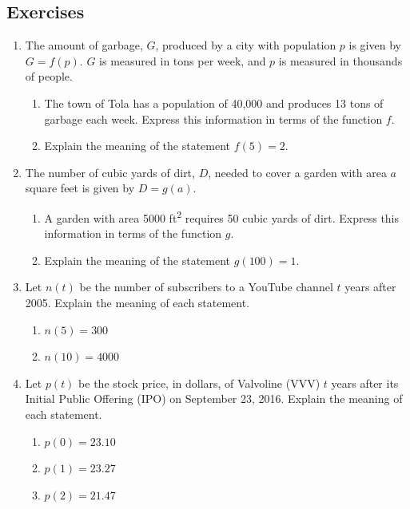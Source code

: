 \subsection{Exercises}
\label{1-2-exercises}

\begin{enumerate}
\item The amount of garbage, $G$, produced by a city with population
  $p$ is given by $G=f(p)$. $G$ is measured in tons per week, and
  $p$ is measured in thousands of people.

  \begin{enumerate}
  \item The town of Tola has a population of 40,000 and produces 13 tons of
    garbage each week. Express this information in terms of the function
    $f$.
  \item Explain the meaning of the statement $f(5)=2$.
  \end{enumerate}

\item The number of cubic yards of dirt, $D$, needed to cover a garden
  with area $a$ square feet is given by $D=g(a)$.

  \begin{enumerate}
  \item A garden with area 5000 ft\textsuperscript{2} requires 50 cubic
    yards of dirt. Express this information in terms of the function
    $g$.
  \item Explain the meaning of the statement $g(100)=1$.
  \end{enumerate}

\item Let $n(t)$ be the number of subscribers to a YouTube channel $t$ years after 2005.
  Explain the meaning of each statement.
  \begin{enumerate}
    \item $n(5) = 300$
    \item $n(10) = 4000$
\end{enumerate}

\item
  Let $p(t)$ be the stock price, in dollars, of Valvoline (VVV) $t$ years after its Initial Public Offering (IPO) on September 23, 2016. Explain the meaning of each statement.
  \begin{enumerate}
    \item $p(0) = 23.10$
    \item $p(1) = 23.27$
    \item $p(2) = 21.47$
\end{enumerate}


\end{enumerate}
